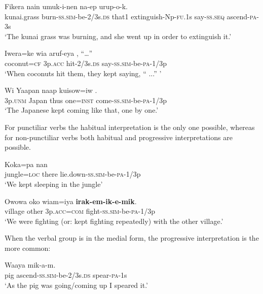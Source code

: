 \ea%
\label{ex:3:x1044}
\gll Fikera  nain umuk-i-nen na-ep urup-o-k.\\
kunai.grass burn-\textsc{ss}.\textsc{sim}-be-2/3s.\textsc{ds} that1 extinguish-Np-\textsc{fu}.1s say-\textsc{ss}.\textsc{seq} ascend-\textsc{pa}-3s\\
\glt`The kunai grass was burning, and she went up in order to extinguish it.'
\z

\ea%
\label{ex:3:x350}
\gll Iwera=ke wia aruf-eya , ``{\dots''} \\
coconut=\textsc{cf} 3p.\textsc{acc} hit-2/3s.\textsc{ds} say-\textsc{ss}.\textsc{sim}-be-\textsc{pa}-1/3p \\
\glt`When coconuts hit them, they kept saying, `` ...'' '
\z

\ea%
\label{ex:3:x1045}
\gll Wi Yaapan naap kuisow=iw . \\
3p.\textsc{unm} Japan thus one=\textsc{inst} come-\textsc{ss}.\textsc{sim}-be-\textsc{pa}-1/3p\\
\glt`The Japanese kept coming like that, one by one.'
\z

For punctiliar verbs the habitual interpretation  is the only one possible, whereas for non-punctiliar  verbs both habitual and progressive interpretations are possible.

\ea%
\label{ex:3:x351}
\gll Koka=pa nan  \\
jungle=\textsc{loc} there lie.down-\textsc{ss}.\textsc{sim}-be-\textsc{pa}-1/3p\\
\glt`We kept sleeping in the jungle'
\z

\ea%
\label{ex:3:x1932}
\gll Owowa oko wiam=iya \textbf{irak-em-ik-e-mik}. \\
village other 3p.\textsc{acc}=\textsc{com} fight-\textsc{ss}.\textsc{sim}-be-\textsc{pa}-1/3p\\
\glt`We were fighting (or: kept fighting repeatedly) with the other village.'
\z

 When the verbal group is in the medial form, the progressive interpretation  is the more common:

\ea%
\label{ex:3:x353}
\gll Waaya   mik-a-m. \\
pig ascend-\textsc{ss}.\textsc{sim}-be-2/3s.\textsc{ds} spear-\textsc{pa}-1s\\
\glt`As the pig was going/coming up I speared it.'
\z

